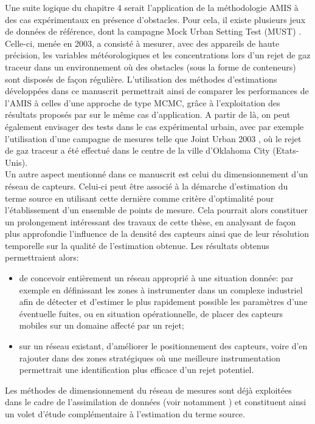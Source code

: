 Une suite logique du chapitre 4 serait l'application de la méthodologie AMIS à des cas expérimentaux en présence d'obstacles. Pour cela, il existe plusieurs jeux de données de référence, dont la campagne Mock Urban Setting Test (MUST) \cite{Yee2004}. Celle-ci, menée en 2003, a consisté à mesurer, avec des appareils de haute précision, les variables météorologiques et les concentrations lors d'un rejet de gaz traceur dans un environnement où des obstacles (sous la forme de conteneurs) sont disposés de façon régulière. L'utilisation des méthodes d'estimations développées dans ce manuscrit permettrait ainsi de comparer les performances de l'AMIS à celles d'une approche de type MCMC, grâce à l'exploitation des résultats proposés par \cite{Keats2007} sur le même cas d'application. A partir de là, on peut également envisager des tests dans le cas expérimental urbain, avec par exemple l'utilisation d'une campagne de mesures telle que Joint Urban 2003 \cite{Allwine2004}, où le rejet de gaz traceur a été effectué dans le centre de la ville d'Oklahoma City (Etats-Unis).\\

Un autre aspect mentionné dans ce manuscrit est celui du dimensionnement d'un réseau de capteurs. Celui-ci peut être associé à la démarche d'estimation du terme source en utilisant cette dernière comme critère d'optimalité pour l'établissement d'un ensemble de points de mesure. Cela pourrait alors constituer un prolongement intéressant des travaux de cette thèse, en analysant de façon plus approfondie l'influence de la densité des capteurs ainsi que de leur résolution temporelle sur la qualité de l'estimation obtenue. Les résultats obtenus permettraient alors: 
\begin{itemize}
	\item de concevoir entièrement un réseau approprié à une situation donnée: par exemple en définissant les zones à instrumenter dans un complexe industriel afin de détecter et d'estimer le plus rapidement possible les paramètres d'une éventuelle fuites, ou en situation opérationnelle, de placer des capteurs mobiles sur un domaine affecté par un rejet;
	\item sur un réseau existant, d'améliorer le positionnement des capteurs, voire d'en rajouter dans des zones stratégiques où une meilleure instrumentation permettrait une identification plus efficace d'un rejet potentiel.
\end{itemize}

Les méthodes de dimensionnement du réseau de mesures sont déjà exploitées dans le cadre de l'assimilation de données (voir notamment \cite{Abida2009}) et constituent ainsi un volet d'étude complémentaire à l'estimation du terme source.\\

